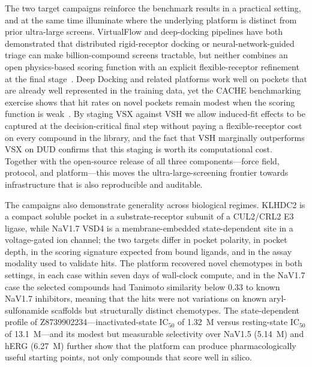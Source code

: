 \documentclass[11pt]{article}
\begin{document}
The two target campaigns reinforce the benchmark results in a practical
setting, and at the same time illuminate where the underlying platform is
distinct from prior ultra-large screens. VirtualFlow and deep-docking
pipelines have both demonstrated that distributed rigid-receptor docking
or neural-network-guided triage can make billion-compound screens
tractable, but neither combines an open physics-based scoring function
with an explicit flexible-receptor refinement at the final
stage~\citep{gorgulla2020virtualflow,gentile2022deepdocking,
yaacoub2022ddgui}. Deep Docking and related platforms work well on
pockets that are already well represented in the training data, yet the
CACHE benchmarking exercise shows that hit rates on novel pockets
remain modest when the scoring function is
weak~\citep{li2024cache}. By staging VSX against VSH we allow
induced-fit effects to be captured at the decision-critical final step
without paying a flexible-receptor cost on every compound in the library,
and the fact that VSH marginally outperforms VSX on DUD confirms that
this staging is worth its computational cost. Together with the
open-source release of all three components---force field, protocol, and
platform---this moves the ultra-large-screening frontier towards
infrastructure that is also reproducible and auditable.

The campaigns also demonstrate generality across biological regimes.
KLHDC2 is a compact soluble pocket in a substrate-receptor subunit of a
CUL2/CRL2 E3 ligase, while NaV1.7 VSD4 is a membrane-embedded
state-dependent site in a voltage-gated ion channel; the two targets
differ in pocket polarity, in pocket depth, in the scoring signature
expected from bound ligands, and in the assay modality used to
validate hits. The platform recovered novel chemotypes in both settings,
in each case within seven days of wall-clock compute, and in the NaV1.7
case the selected compounds had Tanimoto similarity below 0.33 to known
NaV1.7 inhibitors, meaning that the hits were not variations on known
aryl-sulfonamide scaffolds but structurally distinct chemotypes. The
state-dependent profile of Z8739902234---inactivated-state IC$_{50}$ of
1.32~\textmu M versus resting-state IC$_{50}$ of 13.1~\textmu M---and its
modest but measurable selectivity over NaV1.5 (5.14~\textmu M) and hERG
(6.27~\textmu M) further show that the platform can produce
pharmacologically useful starting points, not only compounds that score
well in silico.
\end{document}
